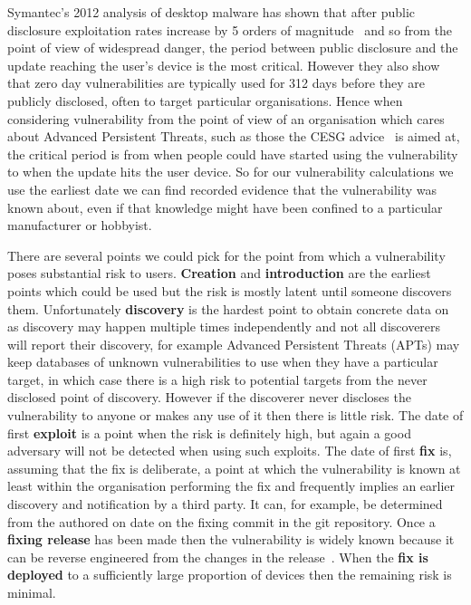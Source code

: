 \documentclass[conference,a4paper,twoside]{IEEEtran}
\begin{document}
Symantec's 2012 analysis of desktop malware has shown that after public disclosure exploitation rates increase by 5 orders of magnitude~\cite{Bilge2012} and so from the point of view of widespread danger, the period between public disclosure and the update reaching the user's device is the most critical.
However they also show that zero day vulnerabilities are typically used for 312 days before they are publicly disclosed, often to target particular organisations.
Hence when considering vulnerability from the point of view of an organisation which cares about Advanced Persistent Threats, such as those the CESG advice~\cite{CESG2013} is aimed at, the critical period is from when people could have started using the vulnerability to when the update hits the user device.
So for our vulnerability calculations we use the earliest date we can find recorded evidence that the vulnerability was known about, even if that knowledge might have been confined to a particular manufacturer or hobbyist.

There are several points we could pick for the point from which a vulnerability poses substantial risk to users.
{\bf Creation} and {\bf introduction} are the earliest points which could be used but the risk is mostly latent until someone discovers them.
Unfortunately {\bf discovery} is the hardest point to obtain concrete data on as discovery may happen multiple times independently and not all discoverers will report their discovery, for example Advanced Persistent Threats (APTs) may keep databases of unknown vulnerabilities to use when they have a particular target, in which case there is a high risk to potential targets from the never disclosed point of discovery.
However if the discoverer never discloses the vulnerability to anyone or makes any use of it then there is little risk.
The date of first {\bf exploit} is a point when the risk is definitely high, but again a good adversary will not be detected when using such exploits.
The date of first {\bf fix} is, assuming that the fix is deliberate, a point at which the vulnerability is known at least within the organisation performing the fix and frequently implies an earlier discovery and notification by a third party.
It can, for example, be determined from the authored on date on the fixing commit in the git repository.
Once a {\bf fixing release} has been made then the vulnerability is widely known because it can be reverse engineered from the changes in the release~\cite{Brumley2008}.
When the {\bf fix is deployed} to a sufficiently large proportion of devices then the remaining risk is minimal.
\end{document}
